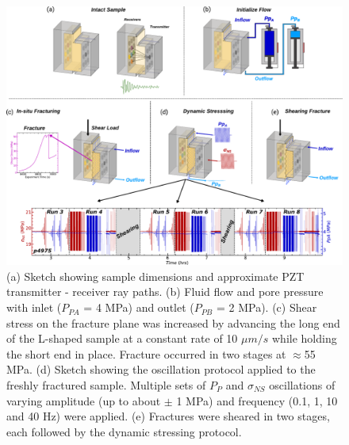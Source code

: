 \documentclass[letterpaper,10pt]{article}
\begin{document}
	\newpage
	
	
	\begin{figure}[ht]
		\centering
		\includegraphics[width=0.99\columnwidth]{exp_sequence_v2}
		\caption[]{(a) Sketch showing sample dimensions and approximate PZT transmitter - receiver ray paths.
			(b) Fluid flow and pore pressure with inlet ($P_{PA}$ = 4 MPa) and outlet ($P_{PB}$ = 2 MPa).
			(c) Shear stress on the fracture plane was increased by advancing the long end of the L-shaped sample at a constant rate of 10 $\mu m/s$ while holding the short end in place. Fracture occurred in two stages at $ \approx $55 MPa.
			(d) Sketch showing the oscillation protocol applied to the freshly fractured sample. Multiple sets of $P_{P}$ and $ \sigma_{NS} $ oscillations of varying amplitude (up to about $ \pm $ 1 MPa) and frequency (0.1, 1, 10 and 40 Hz) were applied.
			(e) Fractures were sheared in two stages, each followed by the dynamic stressing protocol.}
		\label{fig:exp_seq}
	\end{figure}
	
	
	\newpage
	
	
\end{document}
